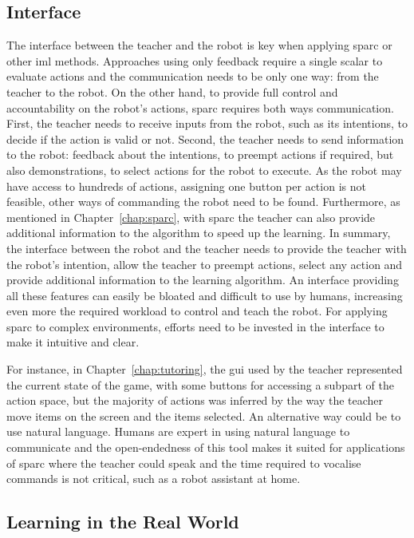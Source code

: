 \subsection{Interface}\label{sec:disc_lim_interface}
The interface between the teacher and the robot is key when applying \gls{sparc} or other \gls{iml} methods. Approaches using only feedback require a single scalar to evaluate actions and the communication needs to be only one way: from the teacher to the robot. On the other hand, to provide full control and accountability on the robot's actions, \gls{sparc} requires both ways communication. First, the teacher needs to receive inputs from the robot, such as its intentions, to decide if the action is valid or not. Second, the teacher needs to send information to the robot: feedback about the intentions, to preempt actions if required, but also demonstrations, to select actions for the robot to execute. As the robot may have access to hundreds of actions, assigning one button per action is not feasible, other ways of commanding the robot need to be found. Furthermore, as mentioned in Chapter~\ref{chap:sparc}, with \gls{sparc} the teacher can also provide additional information to the algorithm to speed up the learning. In summary, the interface between the robot and the teacher needs to provide the teacher with the robot's intention, allow the teacher to preempt actions, select any action and provide additional information to the learning algorithm. An interface providing all these features can easily be bloated and difficult to use by humans, increasing even more the required workload to control and teach the robot. For applying \gls{sparc} to complex environments, efforts need to be invested in the interface to make it intuitive and clear. 

For instance, in Chapter~\ref{chap:tutoring}, the \gls{gui} used by the teacher represented the current state of the game, with some buttons for accessing a subpart of the action space, but the majority of actions was inferred by the way the teacher move items on the screen and the items selected. An alternative way could be to use natural language. Humans are expert in using natural language to communicate and the open-endedness of this tool makes it suited for applications of \gls{sparc} where the teacher could speak and the time required to vocalise commands is not critical, such as a robot assistant at home.

\subsection{Learning in the Real World}

